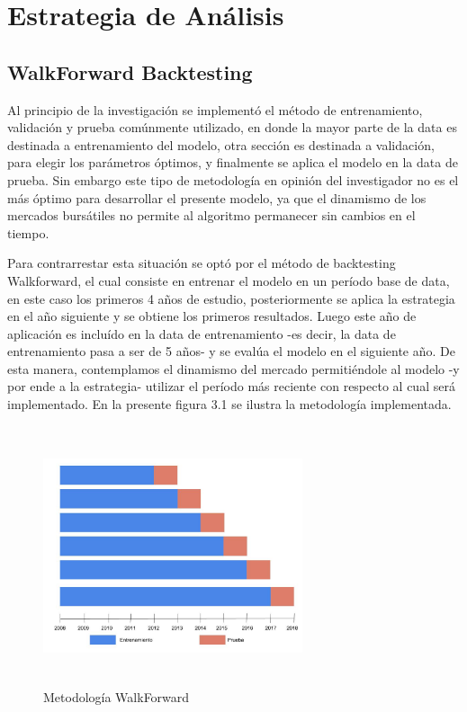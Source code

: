 \documentclass[a4paper,12pt]{Latex/Classes/PhDthesisPSnPDF}
\begin{document}
\section{Estrategia de Análisis}

\subsection{WalkForward Backtesting}

Al principio de la investigación se implementó el método de entrenamiento, validación y prueba comúnmente utilizado, en donde la mayor parte de la data es destinada a entrenamiento del modelo, otra sección es destinada a validación, para elegir los parámetros óptimos, y finalmente se aplica el modelo en la data de prueba. Sin embargo este tipo de metodología en opinión del investigador no es el más óptimo para desarrollar el presente modelo, ya que el dinamismo de los mercados bursátiles no permite al algoritmo permanecer sin cambios en el tiempo.

Para contrarrestar esta situación se optó por el método de backtesting Walkforward, el cual consiste en entrenar el modelo en un período base de data, en este caso los primeros 4 años de estudio, posteriormente se aplica la estrategia en el año siguiente y se obtiene los primeros resultados. Luego este año de aplicación es incluído en la data de entrenamiento -es decir, la data de entrenamiento pasa a ser de 5 años- y se evalúa el modelo en el siguiente año. De esta manera, contemplamos el dinamismo del mercado permitiéndole al modelo -y por ende a la estrategia- utilizar el período más reciente con respecto al cual será implementado. En la presente figura 3.1 se ilustra la metodología implementada.

\begin{figure}[ht]
\begin{center}
\includegraphics[width=3in, height=3in]{images/walkforward_plot}
\end{center}
\caption{Metodología WalkForward}
\end{figure}
\end{document}
